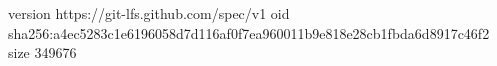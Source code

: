 version https://git-lfs.github.com/spec/v1
oid sha256:a4ec5283c1e6196058d7d116af0f7ea960011b9e818e28cb1fbda6d8917c46f2
size 349676
